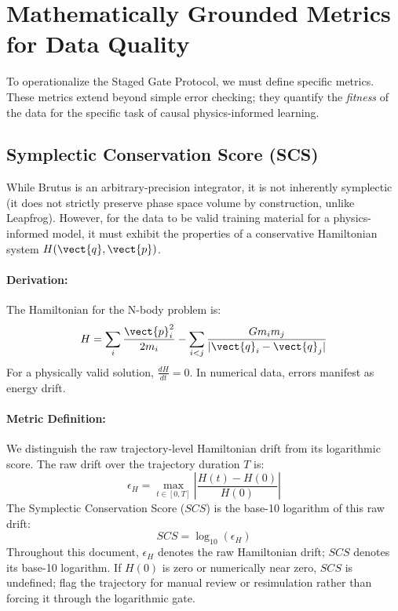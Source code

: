 \section{Mathematically Grounded Metrics for Data Quality}

To operationalize the Staged Gate Protocol, we must define specific metrics. These metrics extend beyond simple error checking; they quantify the \textit{fitness} of the data for the specific task of causal physics-informed learning.

\subsection{Symplectic Conservation Score (SCS)}

While Brutus is an arbitrary-precision integrator, it is not inherently symplectic (it does not strictly preserve phase space volume by construction, unlike Leapfrog). However, for the data to be valid training material for a physics-informed model, it must exhibit the properties of a conservative Hamiltonian system $H(\vect{q}, \vect{p})$.

\paragraph{Derivation:}
The Hamiltonian for the N-body problem is:
\begin{equation}
    H = \sum_{i} \frac{\vect{p}_i^2}{2m_i} - \sum_{i < j} \frac{G m_i m_j}{|\vect{q}_i - \vect{q}_j|}
\end{equation}
For a physically valid solution, $\frac{dH}{dt} = 0$. In numerical data, errors manifest as energy drift.

\paragraph{Metric Definition:}
We distinguish the raw trajectory-level Hamiltonian drift from its logarithmic score. The raw drift over the trajectory duration $T$ is:
\begin{equation}
    \epsilon_H = \max_{t \in [0, T]} \left| \frac{H(t) - H(0)}{H(0)} \right|
\end{equation}
The Symplectic Conservation Score ($SCS$) is the base-10 logarithm of this raw drift:
\begin{equation}
    SCS = \log_{10}(\epsilon_H)
\end{equation}
Throughout this document, $\epsilon_H$ denotes the raw Hamiltonian drift; $SCS$ denotes its base-10 logarithm. If $H(0)$ is zero or numerically near zero, $SCS$ is undefined; flag the trajectory for manual review or resimulation rather than forcing it through the logarithmic gate.

